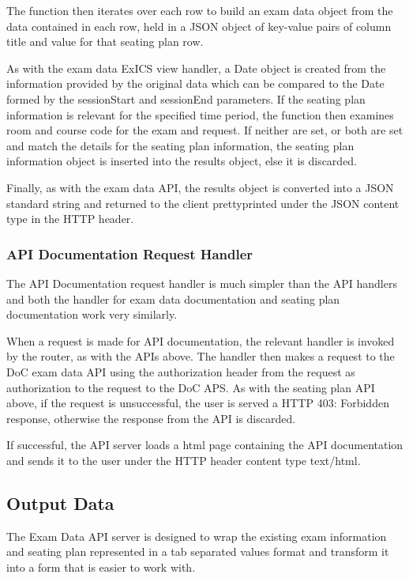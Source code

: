 The function then iterates over each row to build an exam data object from the data contained in each row, held in a JSON object of key-value pairs of column title and value for that seating plan row.

As with the exam data ExICS view handler, a Date object is created from the information provided by the original data which can be compared to the Date formed by the sessionStart and sessionEnd parameters.  If the seating plan information is relevant for the specified time period, the function then examines room and course code for the exam and request.  If neither are set, or both are set and match the details for the seating plan information, the seating plan information object is inserted into the results object, else it is discarded.

Finally, as with the exam data API, the results object is converted into a JSON standard string and returned to the client prettyprinted under the JSON content type in the HTTP header.

\subsubsection{API Documentation Request Handler}

The API Documentation request handler is much simpler than the API handlers and both the handler for exam data documentation and seating plan documentation work very similarly.

When a request is made for API documentation, the relevant handler is invoked by the router, as with the APIs above.  The handler then makes a request to the DoC exam data API using the authorization header from the request as authorization to the request to the DoC APS. As with the seating plan API above, if the request is unsuccessful, the user is served a HTTP 403: Forbidden response, otherwise the response from the API is discarded.

If successful, the API server loads a html page containing the API documentation and sends it to the user under the HTTP header content type text/html.

\subsection{Output Data}

\FloatBarrier

The Exam Data API server is designed to wrap the existing exam information and seating plan represented in a tab separated values format and transform it into a form that is easier to work with.

